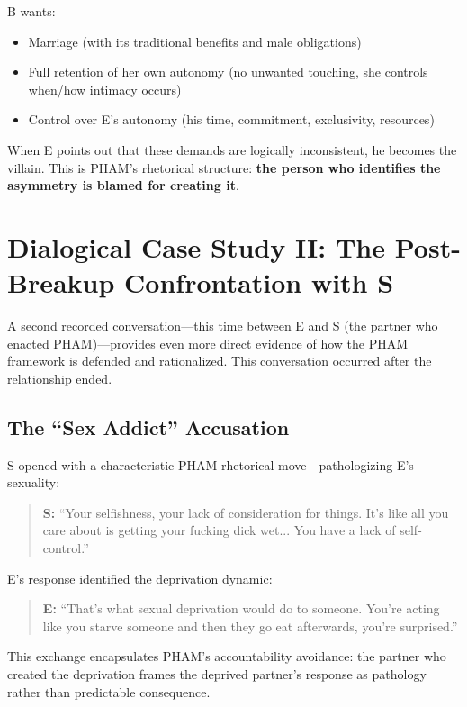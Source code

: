 \documentclass[12pt,openany]{book}
\numberwithin{equation}{chapter}
\begin{document}
B wants:
\begin{itemize}
    \item Marriage (with its traditional benefits and male obligations)
    \item Full retention of her own autonomy (no unwanted touching, she controls when/how intimacy occurs)
    \item Control over E's autonomy (his time, commitment, exclusivity, resources)
\end{itemize}

When E points out that these demands are logically inconsistent, he becomes the villain. This is PHAM's rhetorical structure: \textbf{the person who identifies the asymmetry is blamed for creating it}.

\section{Dialogical Case Study II: The Post-Breakup Confrontation with S}

A second recorded conversation---this time between E and S (the partner who enacted PHAM)---provides even more direct evidence of how the PHAM framework is defended and rationalized. This conversation occurred after the relationship ended.

\subsection{The ``Sex Addict'' Accusation}

S opened with a characteristic PHAM rhetorical move---pathologizing E's sexuality:

\begin{quote}
\textbf{S:} ``Your selfishness, your lack of consideration for things. It's like all you care about is getting your fucking dick wet... You have a lack of self-control.''
\end{quote}

E's response identified the deprivation dynamic:

\begin{quote}
\textbf{E:} ``That's what sexual deprivation would do to someone. You're acting like you starve someone and then they go eat afterwards, you're surprised.''
\end{quote}

This exchange encapsulates PHAM's accountability avoidance: the partner who created the deprivation frames the deprived partner's response as pathology rather than predictable consequence.
\end{document}
